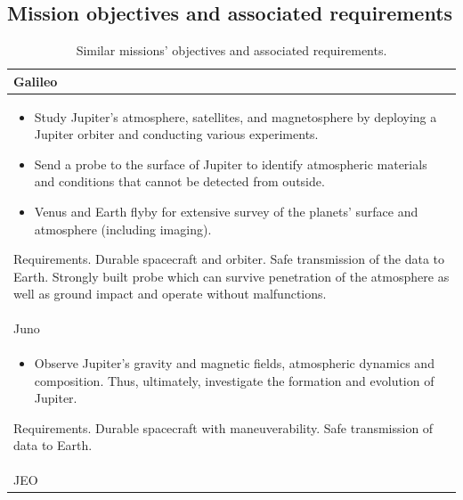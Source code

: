 \subsection{Mission objectives and associated requirements}

\begin{longtable}{p{}}
  \caption{Similar missions' objectives and associated requirements.}
  \\

  Galileo \\* \midrule

  \begin{itemize}
  \item Study Jupiter's atmosphere, satellites, and magnetosphere by
    deploying a Jupiter orbiter and conducting various experiments.
  \item Send a probe to the surface of Jupiter to identify atmospheric
    materials and conditions that cannot be detected from outside.
  \item Venus and Earth flyby for extensive survey of the planets'
    surface and atmosphere (including imaging).
  \end{itemize}

  Requirements. Durable spacecraft and orbiter. Safe transmission of
  the data to Earth.  Strongly built probe which can survive
  penetration of the atmosphere as well as ground impact and operate
  without malfunctions. \\ \pagebreak

  Juno \\* \midrule

  \begin{itemize}
  \item Observe Jupiter's gravity and magnetic fields, atmospheric
    dynamics and composition. Thus, ultimately, investigate the
    formation and evolution of Jupiter.
  \end{itemize}

  Requirements. Durable spacecraft with maneuverability. Safe
  transmission of data to Earth. \\

  JEO \\* \midrule


\end{longtable}
